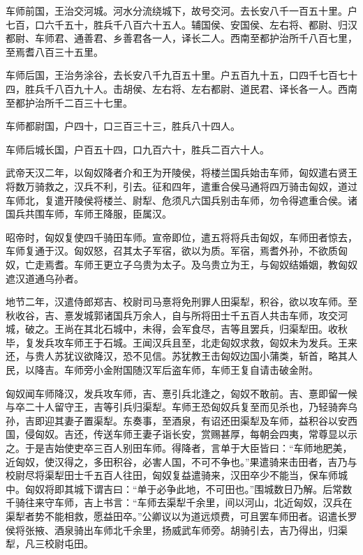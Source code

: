 \documentclass[12pt,UTF8]{ctexbook}
\begin{document}
车师前国，王治交河城。河水分流绕城下，故号交河。去长安八千一百五十里。户七百，口六千五十，胜兵千八百六十五人。辅国侯、安国侯、左右将、都尉、归汉都尉、车师君、通善君、乡善君各一人，译长二人。西南至都护治所千八百七里，至焉耆八百三十五里。



车师后国，王治务涂谷，去长安八千九百五十里。户五百九十五，口四千七百七十四，胜兵千八百九十人。击胡侯、左右将、左右都尉、道民君、译长各一人。西南至都护治所千二百三十七里。



车师都尉国，户四十，口三百三十三，胜兵八十四人。



车师后城长国，户百五十四，口九百六十，胜兵二百六十人。



武帝天汉二年，以匈奴降者介和王为开陵侯，将楼兰国兵始击车师，匈奴遣右贤王将数万骑救之，汉兵不利，引去。征和四年，遣重合侯马通将四万骑击匈奴，道过车师北，复遣开陵侯将楼兰、尉犁、危须凡六国兵别击车师，勿令得遮重合侯。诸国兵共围车师，车师王降服，臣属汉。



昭帝时，匈奴复使四千骑田车师。宣帝即位，遣五将将兵击匈奴，车师田者惊去，车师复通于汉。匈奴怒，召其太子军宿，欲以为质。军宿，焉耆外孙，不欲质匈奴，亡走焉耆。车师王更立子乌贵为太子。及乌贵立为王，与匈奴结婚姻，教匈奴遮汉道通乌孙者。



地节二年，汉遣侍郎郑吉、校尉司马憙将免刑罪人田渠犁，积谷，欲以攻车师。至秋收谷，吉、憙发城郭诸国兵万余人，自与所将田士千五百人共击车师，攻交河城，破之。王尚在其北石城中，未得，会军食尽，吉等且罢兵，归渠犁田。收秋毕，复发兵攻车师王于石城。王闻汉兵且至，北走匈奴求救，匈奴未为发兵。王来还，与贵人苏犹议欲降汉，恐不见信。苏犹教王击匈奴边国小蒲类，斩首，略其人民，以降吉。车师旁小金附国随汉军后盗车师，车师王复自请击破金附。



匈奴闻车师降汉，发兵攻车师，吉、憙引兵北逢之，匈奴不敢前。吉、憙即留一候与卒二十人留守王，吉等引兵归渠犁。车师王恐匈奴兵复至而见杀也，乃轻骑奔乌孙，吉即迎其妻子置渠犁。东奏事，至酒泉，有诏还田渠犁及车师，益积谷以安西国，侵匈奴。吉还，传送车师王妻子诣长安，赏赐甚厚，每朝会四夷，常尊显以示之。于是吉始使吏卒三百人别田车师。得降者，言单于大臣皆曰：“车师地肥美，近匈奴，使汉得之，多田积谷，必害人国，不可不争也。”果遣骑来击田者，吉乃与校尉尽将渠犁田士千五百人往田，匈奴复益遣骑来，汉田卒少不能当，保车师城中。匈奴将即其城下谓吉曰：“单于必争此地，不可田也。”围城数日乃解。后常数千骑往来守车师，吉上书言：“车师去渠犁千余里，间以河山，北近匈奴，汉兵在渠犁者势不能相救，愿益田卒。”公卿议以为道远烦费，可且罢车师田者。诏遣长罗侯将张掖、酒泉骑出车师北千余里，扬威武车师旁。胡骑引去，吉乃得出，归渠犁，凡三校尉屯田。
\end{document}
